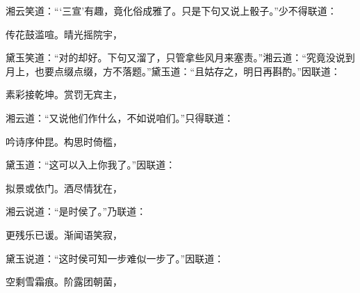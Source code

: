 \begin{parag}
    湘云笑道：“‘三宣’有趣，竟化俗成雅了。只是下句又说上骰子。”少不得联道：
\end{parag}
\begin{poem}
    \begin{pl}

        传花鼓滥喧。晴光摇院宇，

    \end{pl}
\end{poem}


\begin{parag}
    黛玉笑道：“对的却好。下句又溜了，只管拿些风月来塞责。”湘云道：“究竟没说到月上，也要点缀点缀，方不落题。”黛玉道：“且姑存之，明日再斟酌。”因联道：
\end{parag}
\begin{poem}
    \begin{pl}
        素彩接乾坤。赏罚无宾主，
    \end{pl}
\end{poem}


\begin{parag}
    湘云道：“又说他们作什么，不如说咱们。”只得联道：
\end{parag}
\begin{poem}
    \begin{pl}
        吟诗序仲昆。构思时倚槛，
    \end{pl}
\end{poem}


\begin{parag}
    黛玉道：“这可以入上你我了。”因联道：
\end{parag}


\begin{poem}
    \begin{pl}
        拟景或依门。酒尽情犹在，
    \end{pl}
\end{poem}


\begin{parag}
    湘云说道：“是时侯了。”乃联道：
\end{parag}


\begin{poem}
    \begin{pl}
        更残乐已谖。渐闻语笑寂，
    \end{pl}
\end{poem}


\begin{parag}
    黛玉说道：“这时侯可知一步难似一步了。”因联道：
\end{parag}
\begin{poem}
    \begin{pl}
        空剩雪霜痕。阶露团朝菌，
    \end{pl}
\end{poem}


